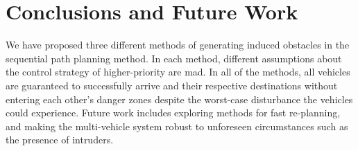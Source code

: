 \section{Conclusions and Future Work}
We have proposed three different methods of generating induced obstacles in the sequential path planning method. In each method, different assumptions about the control strategy of higher-priority are mad. In all of the methods, all vehicles are guaranteed to successfully arrive and their respective destinations without entering each other's danger zones despite the worst-case disturbance the vehicles could experience. Future work includes exploring methods for fast re-planning, and making the multi-vehicle system robust to unforeseen circumstances such as the presence of intruders.